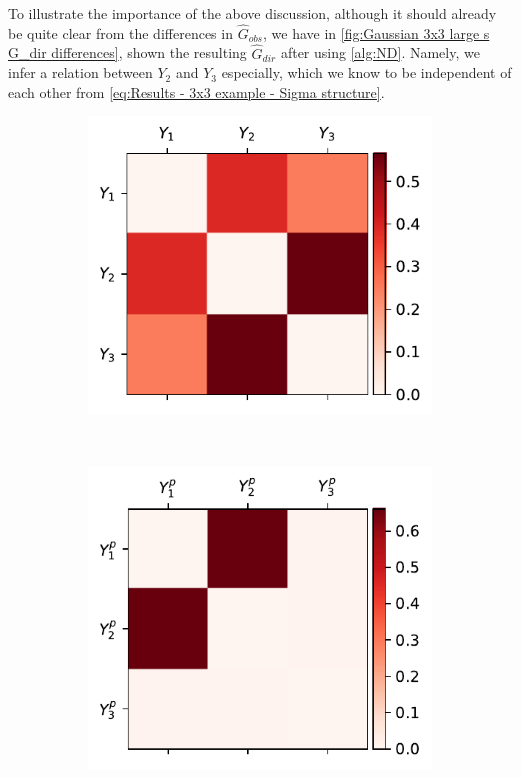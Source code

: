 \documentclass[../Thesis.tex]{subfiles}
\begin{document}
To illustrate the importance of the above discussion, although it should already be quite clear from the differences in $\hat{G}_{obs}$, we have in \autoref{fig:Gaussian 3x3 large s G_dir differences}, shown the resulting $\hat{G}_{dir}$ after using \autoref{alg:ND}. Namely, we infer a relation between $Y_2$ and $Y_3$ especially, which we know to be independent of each other from \autoref{eq:Results - 3x3 example - Sigma structure}.
\begin{figure}[H]
    \centering
    \begin{subfigure}[t]{0.49\textwidth}
        \centering
        \includegraphics[width=\linewidth]{figures/ND examples/Gaussian 3x3 large s.pdf}
        \caption{}
        \label{fig:Gaussian 3x3 large s}
    \end{subfigure}%
    ~
    \begin{subfigure}[t]{0.49\textwidth}
        \centering
        \includegraphics[width=\linewidth]{figures/ND examples/Gaussian 3x3 large s power.pdf}

\end{subfigure}
\end{figure}
\end{document}
